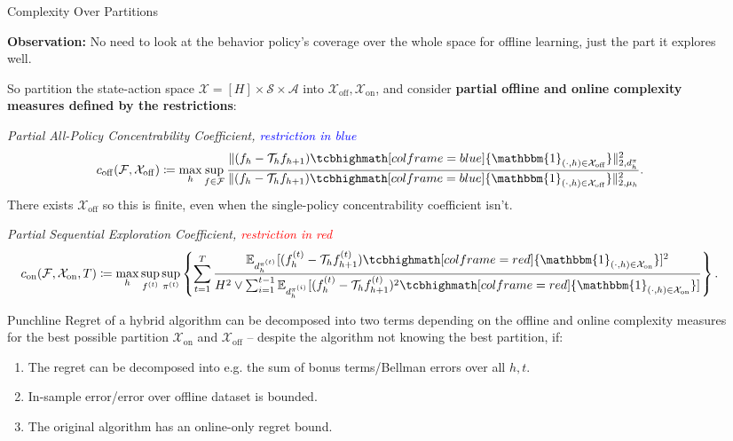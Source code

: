 \documentclass[final]{beamer}
\newcommand{\off}{\operatorname{off}}
\newcommand{\on}{\operatorname{on}}
\newcommand{\gX}{\mathcal{X}}
\newcommand{\gA}{\mathcal{A}}
\newcommand{\gS}{\mathcal{S}}
\newcommand{\gF}{\mathcal{F}}
\newcommand{\gT}{\mathcal{T}}
\newlength{\sepwidth}
\newlength{\colwidth}
\newcommand{\separatorcolumn}{\begin{column}{\sepwidth}\end{column}}
\begin{document}
\begin{frame}[t]
\begin{columns}[t]
\begin{column}{\colwidth}

\end{column}


\separatorcolumn

\begin{column}{\colwidth}

  \begin{block}{Complexity Over Partitions}

  \textbf{Observation:} No need to look at the behavior policy's coverage over the whole space for offline learning, just the part it explores well. 
  
  So partition the state-action space $\gX = [H] \times \gS \times \gA$ into $\gX_{\off}, \gX_{\on}$, and consider \textbf{partial offline and online complexity measures defined by the restrictions}:
  
    \textit{Partial All-Policy Concentrability Coefficient, \textcolor{blue}{restriction in blue}}
        $$c_{\off}(\gF, \gX_{\off}) 
    \coloneqq \max_h \sup_{f \in \gF} \frac{\|(f_h - \gT_h f_{h+1}) \tcbhighmath[colframe=blue]{\mathbbm{1}_{(\cdot, h) \in \gX_{\off}}}\|_{2, d_h^\pi}^2}{\|(f_h - \gT_h f_{h+1})\tcbhighmath[colframe=blue]{\mathbbm{1}_{(\cdot, h) \in \gX_{\off}}}\|_{2, \mu_{h}}^2}.$$
    {\small There exists $\gX_{\off}$ so this is finite, even when the single-policy concentrability coefficient isn't.}

    \textit{Partial Sequential Exploration Coefficient, \textcolor{red}{restriction in red}}
    $$c_{\on}(\gF, \gX_{\on},T) 
    \coloneqq \max_{h} \sup_{f^{(t)}} \sup_{\pi^{(t)}} 
    \left\{\sum_{t=1}^T \frac{ \E_{d_h^{\pi^{(t)}}}[(f_h^{(t)} - \gT_h f_{h+1}^{(t)}) \tcbhighmath[colframe=red]{\mathbbm{1}_{(\cdot, h) \in \gX_{\on}}}]^2}{H^2 \vee \sum_{i=1}^{t-1} \E_{d_h^{\pi^{(i)}}}[(f_h^{(t)} - \gT_h f_{h+1}^{(t)})^2 \tcbhighmath[colframe=red]{\mathbbm{1}_{(\cdot, h) \in \gX_{\on}}}]}\right\}.$$

  \end{block}

    \begin{alertblock}{Punchline}
        Regret of a hybrid algorithm can be decomposed into two terms depending on the offline and online complexity measures for the best possible partition $\gX_{\on}$ and $\gX_{\off}$ -- despite the algorithm not knowing the best partition, if:
        \vspace{-3ex}
        \begin{enumerate}
            \item The regret can be decomposed into e.g. the sum of bonus terms/Bellman errors over all $h, t$.
            \item In-sample error/error over offline dataset is bounded.
            \item The original algorithm has an online-only regret bound.
        \end{enumerate}
    \end{alertblock}


\end{column}
\end{columns}
\end{frame}
\end{document}
